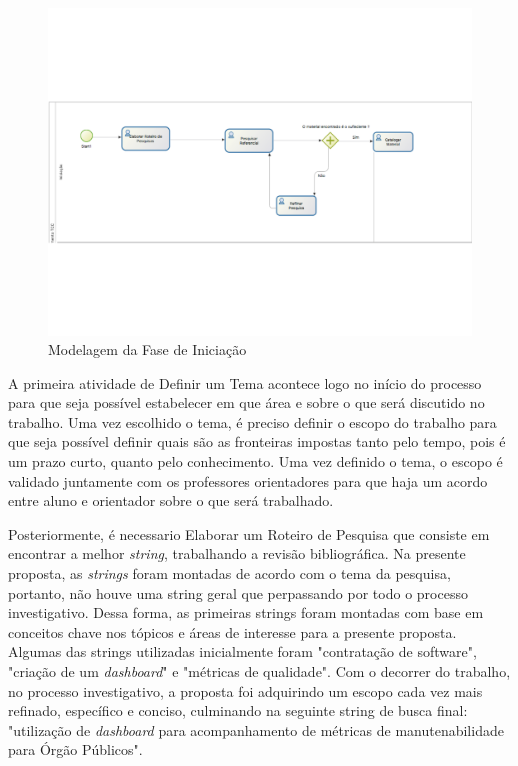 \graphicspath{{figuras/}}
\begin{figure}[h!]
\centering
\includegraphics[scale=0.40]{iniciacao}
\caption{Modelagem da Fase de Iniciação}
\label{img:iniciacao}
\end{figure}

A primeira atividade de Definir um Tema acontece logo no início do processo para que seja possível estabelecer em que área e sobre o que será discutido no trabalho. Uma vez escolhido o tema, é preciso definir o escopo do trabalho para que seja possível definir quais são as fronteiras impostas tanto pelo tempo, pois é um prazo curto, quanto pelo conhecimento. Uma vez definido o tema, o escopo é validado juntamente com os professores orientadores para que haja um acordo entre aluno e orientador sobre o que será trabalhado.

Posteriormente, é necessario Elaborar um Roteiro de Pesquisa  que consiste em encontrar a melhor \textit{string}, trabalhando a revisão bibliográfica. Na presente proposta, as \textit{strings} foram montadas de acordo com o tema da pesquisa, portanto, não houve uma string geral que perpassando por todo o processo investigativo. Dessa forma, as primeiras strings foram montadas com base em conceitos chave nos tópicos e áreas de interesse para a presente proposta. Algumas das strings utilizadas inicialmente foram "contratação de software", "criação de um \textit{dashboard}" e "métricas de qualidade". Com o decorrer do trabalho, no processo investigativo, a proposta foi adquirindo um escopo cada vez mais refinado, específico e conciso, culminando na seguinte string de busca final: "utilização de \textit{dashboard} para acompanhamento de métricas de manutenabilidade para Órgão Públicos". 

